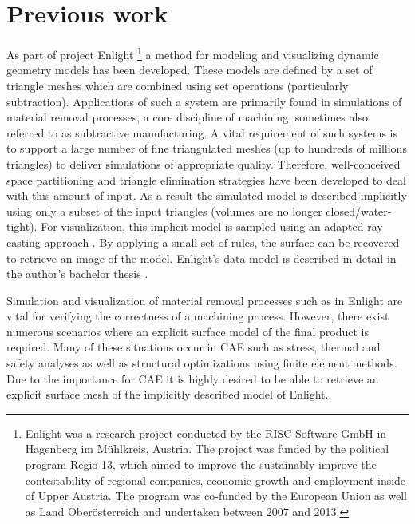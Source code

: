 
\section{Previous work}

As part of project Enlight
\footnote{
	Enlight was a research project conducted by the RISC Software GmbH in Hagenberg im M\"uhlkreis, Austria. The project was funded by the political program Regio 13, which aimed to improve the sustainably improve the contestability of regional companies, economic growth and employment inside of Upper Austria. The program was co-funded by the European Union as well as Land Ober\"osterreich and undertaken between 2007 and 2013.
}
a method for modeling and visualizing dynamic geometry models has been developed. These models are defined by a set of triangle meshes which are combined using set operations (particularly subtraction). Applications of such a system are primarily found in simulations of material removal processes, a core discipline of machining, sometimes also referred to as subtractive manufacturing. A vital requirement of such systems is to support a large number of fine triangulated meshes (up to hundreds of millions triangles) to deliver simulations of appropriate quality. Therefore, well-conceived space partitioning and triangle elimination strategies have been developed to deal with this amount of input. As a result the simulated model is described implicitly using only a subset of the input triangles (volumes are no longer closed/water-tight). For visualization, this implicit model is sampled using an adapted ray casting approach \cite{enlight}. By applying a small set of rules, the surface can be recovered to retrieve an image of the model. Enlight's data model is described in detail in the author's bachelor thesis \cite{bachelor}.

Simulation and visualization of material removal processes such as in Enlight are vital for verifying the correctness of a machining process. However, there exist numerous scenarios where an explicit surface model of the final product is required. Many of these situations occur in CAE such as stress, thermal and safety analyses as well as structural optimizations using finite element methods.
Due to the importance for CAE it is highly desired to be able to retrieve an explicit surface mesh of the implicitly described model of Enlight.